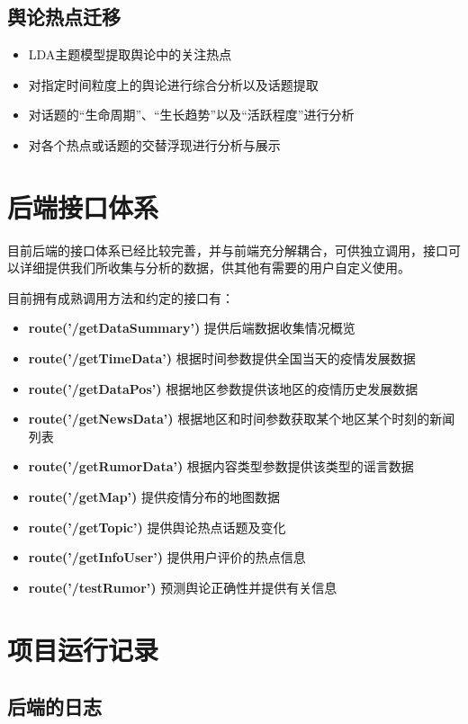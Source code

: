 \documentclass{article}
\begin{document}
\subsection{舆论热点迁移}

\begin{itemize}
	\item{LDA主题模型提取舆论中的关注热点}
	\item{对指定时间粒度上的舆论进行综合分析以及话题提取}
	\item{对话题的“生命周期”、“生长趋势”以及“活跃程度”进行分析}
	\item{对各个热点或话题的交替浮现进行分析与展示}
\end{itemize}


\section{后端接口体系}

目前后端的接口体系已经比较完善，并与前端充分解耦合，可供独立调用，接口可以详细提供我们所收集与分析的数据，供其他有需要的用户自定义使用。

目前拥有成熟调用方法和约定的接口有：
\begin{itemize}
	\item{\textbf{route('/getDataSummary')}} 提供后端数据收集情况概览 
	\item{\textbf{route('/getTimeData')}} 根据时间参数提供全国当天的疫情发展数据
	\item{\textbf{route('/getDataPos')}} 根据地区参数提供该地区的疫情历史发展数据
	\item{\textbf{route('/getNewsData')}} 根据地区和时间参数获取某个地区某个时刻的新闻列表
	\item{\textbf{route('/getRumorData')}} 根据内容类型参数提供该类型的谣言数据
	\item{\textbf{route('/getMap')}} 提供疫情分布的地图数据
	\item{\textbf{route('/getTopic')}} 提供舆论热点话题及变化
	\item{\textbf{route('/getInfoUser')}} 提供用户评价的热点信息
	\item{\textbf{route('/testRumor')}} 预测舆论正确性并提供有关信息
\end{itemize}


\section{项目运行记录}

\subsection{后端的日志}
\end{document}

